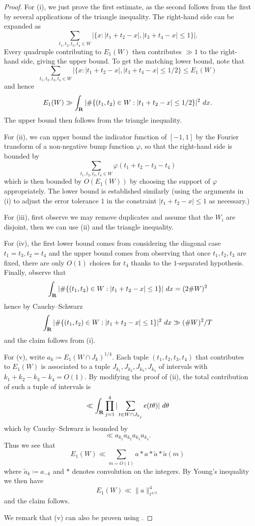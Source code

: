 \begin{proof} For (i), we just prove the first estimate, as the second follows from the first by several applications of the triangle inequality.  The right-hand side can be expanded as
    $$ \sum_{t_1,t_2,t_3,t_4 \in W} |\{ x: |t_1+t_2-x|, |t_3+t_4-x| \leq 1 \}|.$$
Every quadruple contributing to $E_1(W)$ then contributes $\gg 1$ to the right-hand side, giving the upper bound.  To get the matching lower bound, note that
$$ \sum_{t_1,t_2,t_3,t_4 \in W} |\{ x: |t_1+t_2-x|, |t_3+t_4-x| \leq 1/2 \} \leq E_1(W)$$
and hence
$$ E_1(W) \gg \int_{\mathbf{R}} |\# \{ (t_1,t_2) \in W: |t_1+t_2 - x| \leq 1/2\} |^2\ dx.$$
The upper bound then follows from the triangle inequality.

For (ii), we can upper bound the indicator function of $[-1,1]$ by the Fourier transform of a non-negative bump function $\varphi$, so that the right-hand side is bounded by
$$ \sum_{t_1,t_2,t_3,t_4 \in W} \varphi(t_1+t_2-t_3-t_4)$$
which is then bounded by $O(E_1(W))$ by choosing the support of $\varphi$ appropriately.  The lower bound is established similarly (using the arguments in (i) to adjust the error tolerance $1$ in the constraint $ |t_1+t_2 - x| \leq 1$ as necessary.)

For (iii), first observe we may remove duplicates and assume that the $W_i$ are disjoint, then we can use (ii) and the triangle inequality.

For (iv), the first lower bound comes from considering the diagonal case $t_1=t_3, t_2 = t_4$ and the upper bound comes from observing that once $t_1,t_2,t_3$ are fixed, there are only $O(1)$ choices for $t_4$ thanks to the $1$-separated hypothesis.  Finally, observe that
$$ \int_{\mathbf{R}} |\# \{ (t_1,t_2) \in W: |t_1+t_2 - x| \leq 1\} |\ dx = (2 \# W)^2$$
hence by Cauchy--Schwarz
$$ \int_{\mathbf{R}} |\# \{ (t_1,t_2) \in W: |t_1+t_2 - x| \leq 1\} |^2\ dx \gg (\# W)^2/T$$
and the claim follows from (i).

For (v), write $a_k \coloneqq E_1(W \cap J_k)^{1/4}$.  Each tuple $(t_1,t_2,t_3,t_4)$ that contributes to $E_1(W)$ is associated to a tuple $J_{k_1}, J_{k_2}, J_{k_3}, J_{k_4}$ of intervals with $k_1+k_2-k_3-k_4=O(1)$.  By modifying the proof of (ii), the total contribution of such a tuple of intervals is
$$ \ll \int_{\mathbf{R}} \prod_{j=1}^4 |\sum_{t \in W \cap J_{k_j}} e(t\theta)|\ d\theta$$
which by Cauchy--Schwarz is bounded by
$$ \ll a_{k_1} a_{k_2} a_{k_3} a_{k_4}.$$
Thus we see that
$$ E_1(W) \ll \sum_{m=O(1)} a * a * \tilde a * \tilde a(m)$$
where $\tilde a_k \coloneqq a_{-k}$ and $*$ denotes convolution on the integers.  By Young's inequality we then have
$$ E_1(W) \ll \|a\|_{\ell^{4/3}}^4$$
and the claim follows.

We remark that (v) can also be proven using \cite[Lemma 4.8, (4.2)]{cladek-tao}.
\end{proof}

